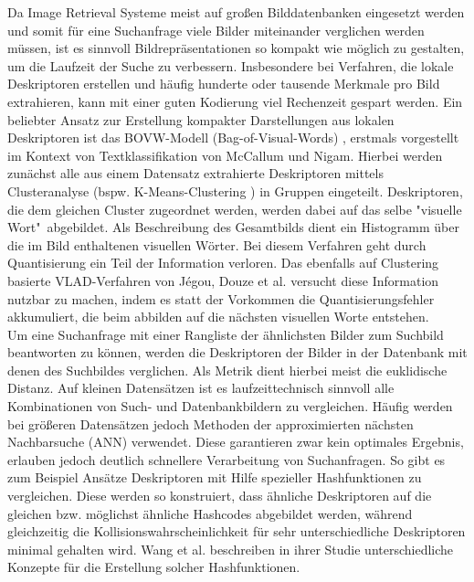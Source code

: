 Da Image Retrieval Systeme meist auf großen Bilddatenbanken eingesetzt werden und somit für eine Suchanfrage viele Bilder miteinander verglichen werden müssen, ist es sinnvoll Bildrepräsentationen so kompakt wie möglich zu gestalten, um die Laufzeit der Suche zu verbessern. Insbesondere bei Verfahren, die lokale Deskriptoren erstellen und häufig hunderte oder tausende Merkmale pro Bild extrahieren, kann mit einer guten Kodierung viel Rechenzeit gespart werden. Ein beliebter Ansatz zur Erstellung kompakter Darstellungen aus lokalen Deskriptoren ist das BOVW-Modell (Bag-of-Visual-Words) \cite{bow}, erstmals vorgestellt im Kontext von Textklassifikation von McCallum und Nigam. Hierbei werden zunächst alle aus einem Datensatz extrahierte Deskriptoren mittels Clusteranalyse (bspw. K-Means-Clustering \cite{k_means}) in Gruppen eingeteilt. Deskriptoren, die dem gleichen Cluster zugeordnet werden, werden dabei auf das selbe "visuelle Wort"\ abgebildet. Als Beschreibung des Gesamtbilds dient ein Histogramm über die im Bild enthaltenen visuellen Wörter. Bei diesem Verfahren geht durch Quantisierung ein Teil der Information verloren. Das ebenfalls auf Clustering basierte VLAD-Verfahren \cite{vlad} von Jégou, Douze et al. versucht diese Information nutzbar zu machen, indem es statt der Vorkommen die Quantisierungsfehler akkumuliert, die beim abbilden auf die nächsten visuellen Worte entstehen. \\
Um eine Suchanfrage mit einer Rangliste der ähnlichsten Bilder zum Suchbild beantworten zu können, werden die Deskriptoren der Bilder in der Datenbank mit denen des Suchbildes verglichen. Als Metrik dient hierbei meist die euklidische Distanz. Auf kleinen Datensätzen ist es laufzeittechnisch sinnvoll alle Kombinationen von Such- und Datenbankbildern zu vergleichen. Häufig werden bei größeren Datensätzen jedoch Methoden der approximierten nächsten Nachbarsuche (ANN) verwendet. Diese garantieren zwar kein optimales Ergebnis, erlauben jedoch deutlich schnellere Verarbeitung von Suchanfragen. So gibt es zum Beispiel Ansätze Deskriptoren mit Hilfe spezieller Hashfunktionen zu vergleichen. Diese werden so konstruiert, dass ähnliche Deskriptoren auf die gleichen bzw. möglichst ähnliche Hashcodes abgebildet werden, während gleichzeitig die Kollisionswahrscheinlichkeit für sehr unterschiedliche Deskriptoren minimal gehalten wird. Wang et al. beschreiben in ihrer Studie \cite{simsearch} unterschiedliche Konzepte für die Erstellung solcher Hashfunktionen.







